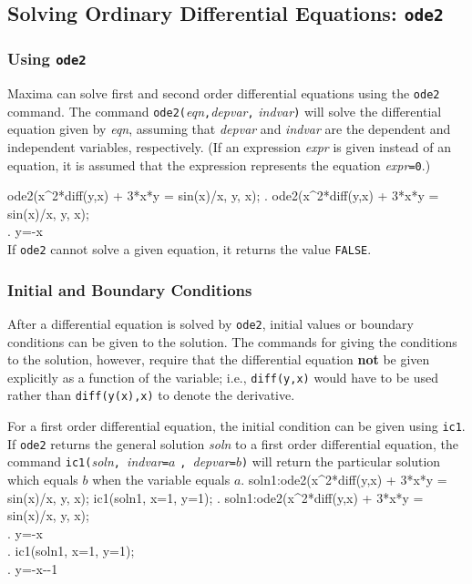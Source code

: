 \subsection{Solving Ordinary Differential Equations: \texttt{ode2}}
\label{subsec:ode2}

\subsubsection{Using \texttt{ode2}}

Maxima can solve first and second order differential equations using
the \texttt{ode2} command.  The command
\texttt{ode2(}\textit{eqn}\texttt{,}\textit{depvar}\texttt{,}%
\textit{indvar}\texttt{)}  will solve the differential equation
given by \textit{eqn}, assuming that \textit{depvar} and
\textit{indvar} are the dependent and independent variables,
respectively.  (If an expression \textit{expr} is given instead of an
equation, it is assumed that the expression represents the equation
\textit{expr}\texttt{=0}.)

\beginmaximasession
ode2(x^2*diff(y,x) + 3*x*y = sin(x)/x, y, x);
\maximatexsession
{}.  ode2(x^2*diff(y,x) + 3*x*y = sin(x)/x, y, x); \\
.   y={{-\cos x}} \\
\endmaximasession
\noindent
If \texttt{ode2} cannot solve a given equation, it returns
the value \texttt{FALSE}.

\subsubsection{Initial and Boundary Conditions}

After a differential equation is solved by \texttt{ode2}, initial
values or boundary conditions can be given to the solution.  The
commands for giving the conditions to the solution, however, require
that the differential equation \textbf{not} be given explicitly as a
function of the variable; i.e., \texttt{diff(y,x)} would have to be used
rather than \texttt{diff(y(x),x)} to denote the derivative.

For a first order differential equation, the initial condition can be
given using \texttt{ic1}. If \texttt{ode2} returns the general
solution \textit{soln} to a first order differential equation, the
command
\texttt{ic1(}\textit{soln}\texttt{, }\textit{indvar}\texttt{=}$a$%
\texttt{, }\textit{depvar}\texttt{=}$b$\texttt{)} will return the
particular solution which equals $b$ when the variable equals $a$.
\beginmaximasession
soln1:ode2(x^2*diff(y,x) + 3*x*y = sin(x)/x, y, x);
ic1(soln1, x=1, y=1);
\maximatexsession
{}.  soln1:ode2(x^2*diff(y,x) + 3*x*y = sin(x)/x, y, x); \\
.   y={{-\cos x}} \\
.  ic1(soln1, x=1, y=1); \\
.   y=-{{\cos x--1}} \\
\endmaximasession

